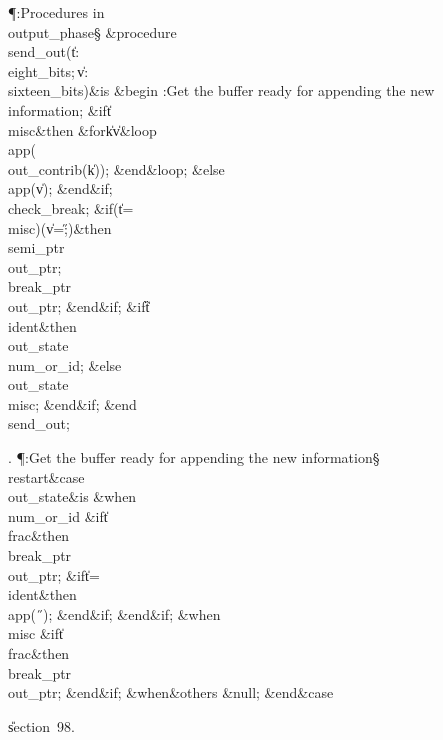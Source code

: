 \Y\P\?\4:Procedures in \\{output\_phase}\X\mathrel{+}\S\?\6
\&{procedure}\8\1\\{send\_out}\?(\?\|t\?:\?\\{eight\_bits};\?\,\1\?\|v\?:\?%
\\{sixteen\_bits}\?\2)\?\2\8\&{is}\8\1\6
\4\&{begin}\6
:Get the buffer ready for appending the new information\X;\6
\&{if}\1\1\8\|t\?\I\?\\{misc}\2\8\&{then}\6
\1\&{for}\8\|k\?\in{}\?\to\?\|v\8\&{loop}\6
\\{app}\?\1(\?\\{out\_contrib}\?\1(\?\|k\?\2)\2)\?;\2\6
\&{end}\8\&{loop};\6
\4\&{else}\6
\\{app}\?\1(\?\|v\?\2)\?;\2\6
\&{end}\8\2\&{if}\1;\6
\\{check\_break};\6
\&{if}\1\1\?\8\1(\?\|t\?=\?\\{misc}\?\2)\W\1(\?\|v\?=\?\H{;}\?\2)\?\2\8\&{then}%
\6
\\{semi\_ptr}\?\K\?\\{out\_ptr};\5
\\{break\_ptr}\?\K\?\\{out\_ptr};\2\6
\&{end}\8\2\&{if}\1;\6
\&{if}\1\1\8\|t\?\G\?\\{ident}\2\8\&{then}\6
\\{out\_state}\?\K\?\\{num\_or\_id};\6
\4\&{else}\6
\\{out\_state}\?\K\?\\{misc};\2\6
\&{end}\8\2\&{if}\1;\2\6
\&{end}\8\\{send\_out};\par
\fi

. \P\?:Get the buffer ready for appending the new information\X\S\?\6
\4\BL\\{restart}\EL\8\&{case}\1\8\\{out\_state}\1\8\&{is}\8\6
\4\&{when}\8\\{num\_or\_id}\KR\6
\&{if}\1\1\8\|t\?\I\?\\{frac}\2\8\&{then}\6
\\{break\_ptr}\?\K\?\\{out\_ptr};\6
\&{if}\1\1\8\|t\?=\?\\{ident}\2\8\&{then}\6
\\{app}\?\1(\?\H{\ }\?\2)\?;\2\6
\&{end}\8\2\&{if}\1;\2\6
\&{end}\8\2\&{if}\1;\6
\4\&{when}\8\\{misc}\KR\6
\&{if}\1\1\8\|t\?\I\?\\{frac}\2\8\&{then}\6
\\{break\_ptr}\?\K\?\\{out\_ptr};\2\6
\&{end}\8\2\&{if}\1;\6
\4\&{when}\8\&{others}\8\KR\6
\&{null};\2\6
\4\2\&{end}\8\&{case}\par
\U section~98.\fi

